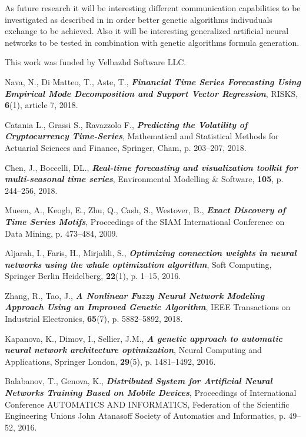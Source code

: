 \documentclass[graybox]{svmult}
\begin{document}
As future research it will be interesting different communication capabilities to be investigated as described in \cite{alexandrov01} in order better genetic algorithms indivuduals exchange to be achieved. Also it will be interesting generalized artificial neural networks \cite{tashev01} to be tested in combination with genetic algorithms formula generation.

\begin{acknowledgement}
This work was funded by Velbazhd Software LLC.
\end{acknowledgement}

\begin{thebibliography}{99}

 Nava, N., Di Matteo, T., Aste, T., \textbf{\textit{Financial Time Series Forecasting Using Empirical Mode Decomposition and Support Vector Regression}}, RISKS, \textbf{6}(1), article 7, 2018.

 Catania L., Grassi S., Ravazzolo F., \textbf{\textit{Predicting the Volatility of Cryptocurrency Time-Series}}, Mathematical and Statistical Methods for Actuarial Sciences and Finance, Springer, Cham, p. 203--207, 2018.

 Chen, J., Boccelli, DL., \textbf{\textit{Real-time forecasting and visualization toolkit for multi-seasonal time series}}, Environmental Modelling \& Software, \textbf{105}, p. 244--256, 2018.


 Mueen, A., Keogh, E., Zhu, Q., Cash, S., Westover, B., \textbf{\textit{Exact Discovery of Time Series Motifs}}, Proceedings of the SIAM International Conference on Data Mining, p. 473--484, 2009.

 Aljarah, I., Faris, H., Mirjalili, S., \textbf{\textit{Optimizing connection weights in neural networks using the whale optimization algorithm}}, Soft Computing, Springer Berlin Heidelberg, \textbf{22}(1), p. 1--15, 2016.

 Zhang, R., Tao, J., \textbf{\textit{A Nonlinear Fuzzy Neural Network Modeling Approach Using an Improved Genetic Algorithm}}, IEEE Transactions on Industrial Electronics, \textbf{65}(7), p. 5882--5892, 2018.

 Kapanova, K., Dimov, I., Sellier, J.M., \textbf{\textit{A genetic approach to automatic neural network architecture optimization}}, Neural Computing and Applications, Springer London, \textbf{29}(5), p. 1481--1492, 2016.

 Balabanov, T., Genova, K., \textbf{\textit{Distributed System for Artificial Neural Networks Training Based on Mobile Devices}}, Proceedings of International Conference AUTOMATICS AND INFORMATICS, Federation of the Scientific Engineering Unions John Atanasoff Society of Automatics and Informatics, p. 49--52, 2016.


\end{thebibliography}
\end{document}
